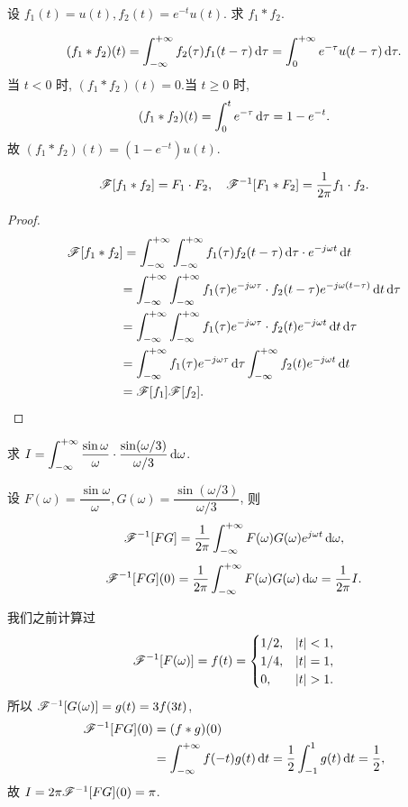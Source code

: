 \documentclass[nocolor,theme=doremi,lang=cn,11pt,chinese,twoside,openright,usesamecnt]{elegantbook}
\newenvironment{block}[1]{\begin{tcolorbox}[blockstyle,title=#1]}{\end{tcolorbox}}
\begin{document}
\begin{example}
	设 $f_1(t)=u(t),f_2(t)=e^{-t}u(t)$. 求 $f_1\ast f_2$.
\end{example}
\begin{solution}
	\[(f_1\ast f_2)(t)=\int_{-\infty}^{+\infty} f_2(\tau)f_1(t-\tau)\,\mathrm{d} \tau=\int_0^{+\infty} e^{-\tau}u(t-\tau)\,\mathrm{d} \tau.\]
	当 $t<0$ 时, $(f_1\ast f_2)(t)=0$.当 $t\ge0$ 时, 
		\[(f_1\ast f_2)(t)=\int_0^t e^{-\tau}\,\mathrm{d} \tau=1-e^{-t}.\]
	故 $(f_1\ast f_2)(t)=(1-e^{-t})u(t)$.
\end{solution}

\begin{block}{卷积定理}
	\[\mathscr{F}[f_1\ast f_2]=F_1\cdot F_2,\quad
	\mathscr{F}^{-1}[F_1\ast F_2]=\frac1{2\pi}f_1\cdot f_2.\]
\end{block}

\begin{proof}
	\begin{align*}
		\mathscr{F}[f_1\ast f_2]&=\int_{-\infty}^{+\infty}\int_{-\infty}^{+\infty}f_1(\tau)f_2(t-\tau)\,\mathrm{d} \tau \cdot e^{-j\omega t}\,\mathrm{d} t\\
		&{=\int_{-\infty}^{+\infty}\int_{-\infty}^{+\infty}f_1(\tau)e^{-j\omega \tau}\cdot f_2(t-\tau)e^{-j\omega (t-\tau)}\,\mathrm{d} t\,\mathrm{d} \tau}\\
		&{=\int_{-\infty}^{+\infty}\int_{-\infty}^{+\infty}f_1(\tau)e^{-j\omega \tau}\cdot f_2(t)e^{-j\omega t}\,\mathrm{d} t\,\mathrm{d} \tau}\\
		&{=\int_{-\infty}^{+\infty}f_1(\tau)e^{-j\omega \tau}\,\mathrm{d}\tau\int_{-\infty}^{+\infty}f_2(t)e^{-j\omega t}\,\mathrm{d} t}\\
		&{=\mathscr{F}[f_1]\mathscr{F}[f_2].\qedhere}
	\end{align*}
\end{proof}

\begin{example}
	求 $\displaystyle	I=\int_{-\infty}^{+\infty}\frac{\sin \omega}{\omega}\cdot \frac{\sin (\omega/3)}{\omega/3}\,\mathrm{d}\omega$.
\end{example}

\begin{solution}
		设 $F(\omega)=\dfrac{\sin\omega}{\omega},G(\omega)=\dfrac{\sin(\omega/3)}{\omega/3}$,%
	{则
		\[\mathscr{F}^{-1}[FG]=\frac1{2\pi}\int_{-\infty}^{+\infty}F(\omega)G(\omega)e^{j\omega t}\,\mathrm{d}\omega,\]
		\[\mathscr{F}^{-1}[FG](0)=\frac1{2\pi}\int_{-\infty}^{+\infty}F(\omega)G(\omega)\,\mathrm{d}\omega=\frac1{2\pi}I.\]
	}

		我们之前计算过
		\[\msf^{-1}[F(\omega)]=f(t)=\begin{cases}
			1/2, & |t|<1,\\
			1/4, & |t|=1,\\
			0, & |t|>1.
		\end{cases}\]
	{所以 $\mathscr{F}^{-1}[G(\omega)]=g(t)=3f(3t)$,
		\begin{align*}
			\mathscr{F}^{-1}[FG](0)&=(f\ast g)(0)\\
			&=\int_{-\infty}^{+\infty}f(-t)g(t)\,\mathrm{d} t=\frac{1}{2}\int_{-1}^1 g(t)\,\mathrm{d} t=\frac{1}{2} ,
		\end{align*}故 $I=2\pi\mathscr{F}^{-1}[FG](0)=\pi$.}
\end{solution}
\end{document}
